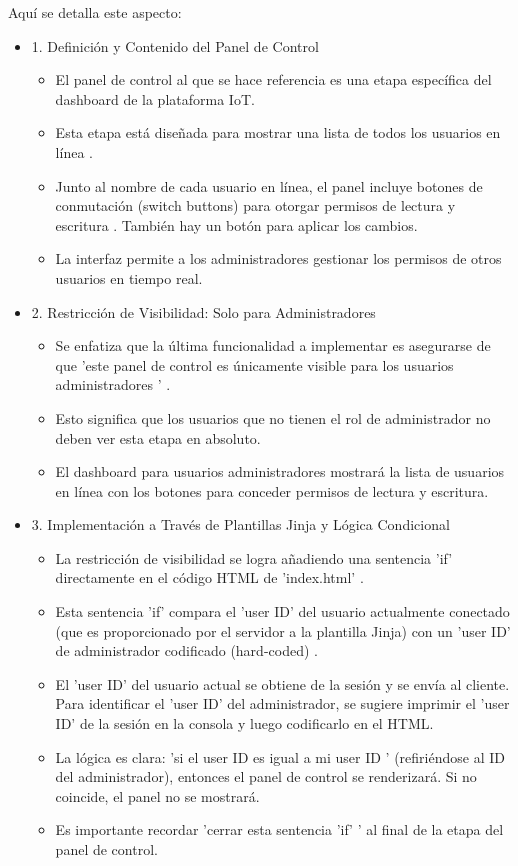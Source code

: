 \documentclass{report}
\begin{document}
Aquí se detalla este aspecto:
\begin{itemize}
    \item 1. Definición y Contenido del Panel de Control
    \begin{itemize}
        \item El panel de control al que se hace referencia es una etapa específica del dashboard de la plataforma IoT.
        \item Esta etapa está diseñada para mostrar una  lista de todos los usuarios en línea .
        \item Junto al nombre de cada usuario en línea, el panel incluye  botones de conmutación (switch buttons)  para  otorgar permisos de lectura y 
        escritura . También hay un botón para aplicar los cambios.
        \item La interfaz permite a los administradores gestionar los permisos de otros usuarios en tiempo real.
    \end{itemize}

    \item 2. Restricción de Visibilidad: Solo para Administradores
    \begin{itemize}
        \item Se enfatiza que la última funcionalidad a implementar es asegurarse de que   'este panel de control es únicamente visible para los 
        usuarios administradores ' .
        \item Esto significa que los usuarios que no tienen el rol de administrador no deben ver esta etapa en absoluto.
        \item El dashboard para usuarios administradores mostrará la lista de usuarios en línea con los botones para conceder permisos de lectura y escritura.    
    \end{itemize}

    \item 3. Implementación a Través de Plantillas Jinja y Lógica Condicional
    \begin{itemize}
        \item La restricción de visibilidad se logra añadiendo una  sentencia 'if' directamente en el código HTML de 'index.html' .
        \item Esta sentencia 'if' compara el 'user ID' del usuario actualmente conectado (que es proporcionado por el servidor a la plantilla Jinja) 
        con un  'user ID' de administrador codificado (hard-coded) .
        \item El 'user ID' del usuario actual se obtiene de la sesión y se envía al cliente. Para identificar el 'user ID' del administrador, se 
        sugiere imprimir el 'user ID' de la sesión en la consola y luego codificarlo en el HTML.
        \item La lógica es clara:   'si el user ID es igual a mi user ID '  (refiriéndose al ID del administrador), entonces el panel de control se 
        renderizará. Si no coincide, el panel no se mostrará.
        \item Es importante recordar   'cerrar esta sentencia 'if' '  al final de la etapa del panel de control.    
    \end{itemize}


\end{itemize}
\end{document}
